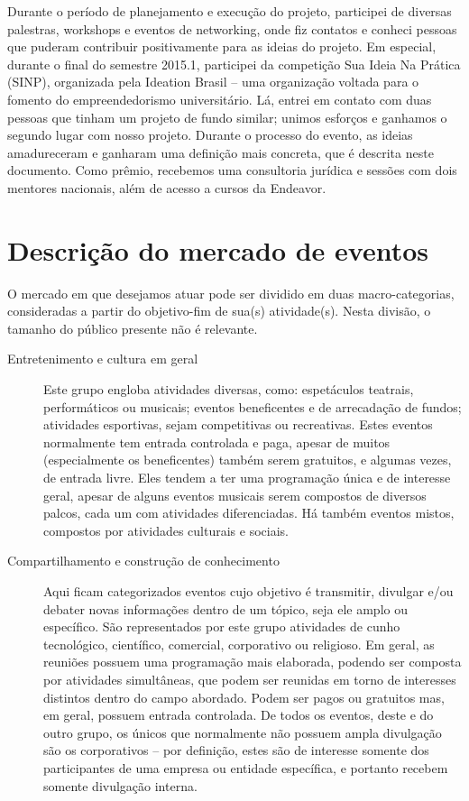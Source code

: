 \documentclass[12pt,a4paper,twoside,hyphens,english,brazil]{abntex2}
\begin{document}
Durante o período de planejamento e execução do projeto, participei de diversas palestras, workshops\cite{workshop-startup} e eventos de networking, onde fiz contatos e conheci pessoas que puderam contribuir positivamente para as ideias do projeto. Em especial, durante o final do semestre 2015.1, participei da competição Sua Ideia Na Prática (SINP), organizada pela Ideation Brasil\cite{sinp-2015.1} -- uma organização voltada para o fomento do empreendedorismo universitário. Lá, entrei em contato com duas pessoas que tinham um projeto de fundo similar; unimos esforços e ganhamos o segundo lugar com nosso projeto. Durante o processo do evento, as ideias amadureceram e ganharam uma definição mais concreta, que é descrita neste documento. Como prêmio, recebemos uma consultoria jurídica e sessões com dois mentores nacionais, além de acesso a cursos da Endeavor.


\section{Descrição do mercado de eventos}
O mercado em que desejamos atuar pode ser dividido em duas macro-categorias, consideradas a partir do objetivo-fim de sua(s) atividade(s). Nesta divisão, o tamanho do público presente não é relevante. %

\begin{description}
	\item[Entretenimento e cultura em geral]
	Este grupo engloba atividades diversas, como: espetáculos teatrais, performáticos ou musicais; eventos beneficentes e de arrecadação de fundos; atividades esportivas, sejam competitivas ou recreativas. Estes eventos normalmente tem entrada controlada e paga, apesar de muitos (especialmente os beneficentes) também serem gratuitos, e algumas vezes, de entrada livre. Eles tendem a ter uma programação única e de interesse geral, apesar de alguns eventos musicais serem compostos de diversos palcos, cada um com atividades diferenciadas. Há também eventos mistos, compostos por atividades culturais e sociais.

	\item[Compartilhamento e construção de conhecimento]
	Aqui ficam categorizados eventos cujo objetivo é transmitir, divulgar e/ou debater novas informações dentro de um tópico, seja ele amplo ou específico. São representados por este grupo atividades de cunho tecnológico, científico, comercial, corporativo ou religioso. Em geral, as reuniões possuem uma programação mais elaborada, podendo ser composta por atividades simultâneas, que podem ser reunidas em torno de interesses distintos dentro do campo abordado. Podem ser pagos ou gratuitos mas, em geral, possuem entrada controlada. De todos os eventos, deste e do outro grupo, os únicos que normalmente não possuem ampla divulgação são os corporativos -- por definição, estes são de interesse somente dos participantes de uma empresa ou entidade específica, e portanto recebem somente divulgação interna.
\end{description}
\end{document}
